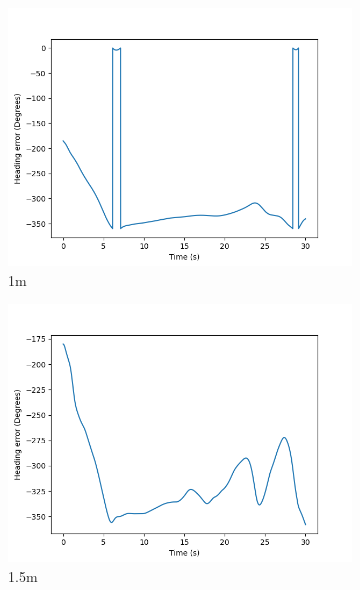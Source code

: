 \documentclass[class=article, crop=false]{standalone}
\begin{document}
\begin{figure}
\begin{subfigure}[b]{0.48\textwidth}
        \label{}
    \end{subfigure}
    \vfill
    \begin{subfigure}[b]{0.48\textwidth}
        \centering
        \includegraphics{scenario1/rov-0m/1.0m/usv_heading_error_controlled}
        \caption{1m}
        \label{}
    \end{subfigure}
    \hfill
    \begin{subfigure}[b]{0.48\textwidth}
        \centering
        \includegraphics{scenario1/rov-0m/1.5m/usv_heading_error_controlled}
        \caption{1.5m}
        \label{}
    \end{subfigure}
    \vfill
    \begin{subfigure}[b]{0.48\textwidth}

\end{subfigure}
\end{figure}
\end{document}
